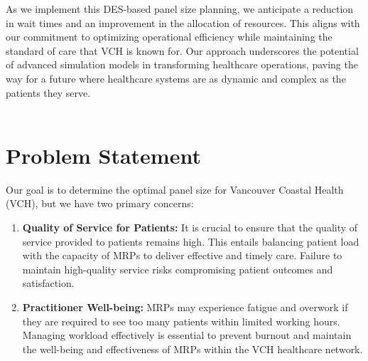 \documentclass[11pt]{article}
\theoremstyle{definition}
\begin{document}
As we implement this DES-based panel size planning, we anticipate a reduction in wait times and an improvement in the allocation of resources. This aligns with our commitment to optimizing operational efficiency while maintaining the standard of care that VCH is known for. Our approach underscores the potential of advanced simulation models in transforming healthcare operations, paving the way for a future where healthcare systems are as dynamic and complex as the patients they serve.\\\\
\section{Problem Statement}

Our goal is to determine the optimal panel size for Vancouver Coastal Health (VCH), but we have two primary concerns:

\begin{enumerate}
    \item \textbf{Quality of Service for Patients:} It is crucial to ensure that the quality of service provided to patients remains high. This entails balancing patient load with the capacity of MRPs to deliver effective and timely care. Failure to maintain high-quality service risks compromising patient outcomes and satisfaction.
    
    \item \textbf{Practitioner Well-being:} MRPs may experience fatigue and overwork if they are required to see too many patients within limited working hours. Managing workload effectively is essential to prevent burnout and maintain the well-being and effectiveness of MRPs within the VCH healthcare network.
\end{enumerate}
\end{document}
